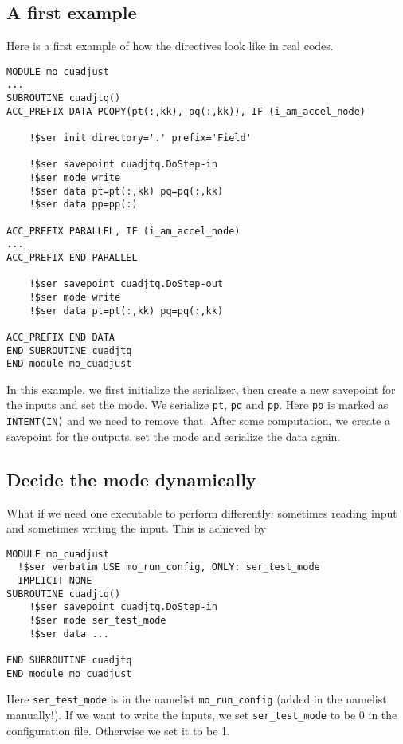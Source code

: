 \documentclass{article}
\begin{document}
\subsection{A first example}
\label{ex:first}
Here is a first example of how the directives look like in real codes.
\begin{lstlisting}
MODULE mo_cuadjust
...
SUBROUTINE cuadjtq()
ACC_PREFIX DATA PCOPY(pt(:,kk), pq(:,kk)), IF (i_am_accel_node)

    !$ser init directory='.' prefix='Field'

    !$ser savepoint cuadjtq.DoStep-in
    !$ser mode write
    !$ser data pt=pt(:,kk) pq=pq(:,kk)
    !$ser data pp=pp(:)

ACC_PREFIX PARALLEL, IF (i_am_accel_node)
...
ACC_PREFIX END PARALLEL

    !$ser savepoint cuadjtq.DoStep-out
    !$ser mode write
    !$ser data pt=pt(:,kk) pq=pq(:,kk)

ACC_PREFIX END DATA
END SUBROUTINE cuadjtq
END module mo_cuadjust
\end{lstlisting}

In this example, we first initialize the serializer, then create a new savepoint for the inputs and set the mode. We serialize \texttt{pt}, \texttt{pq} and \texttt{pp}. Here \texttt{pp} is marked as \texttt{INTENT(IN)} and we need to remove that. After some computation, we create a savepoint for the outputs, set the mode and serialize the data again.

\subsection{Decide the mode dynamically}
\label{ex:mode}
What if we need one executable to perform differently: sometimes reading input and sometimes writing the input. This is achieved by
\begin{lstlisting}
MODULE mo_cuadjust
  !$ser verbatim USE mo_run_config, ONLY: ser_test_mode
  IMPLICIT NONE
SUBROUTINE cuadjtq()
    !$ser savepoint cuadjtq.DoStep-in
    !$ser mode ser_test_mode
    !$ser data ...

END SUBROUTINE cuadjtq
END module mo_cuadjust
\end{lstlisting}

Here \texttt{ser\_test\_mode} is in the namelist \texttt{mo\_run\_config} (added in the namelist manually!). If we want to write the inputs, we set \texttt{ser\_test\_mode} to be 0 in the configuration file. Otherwise we set it to be 1.
\end{document}
